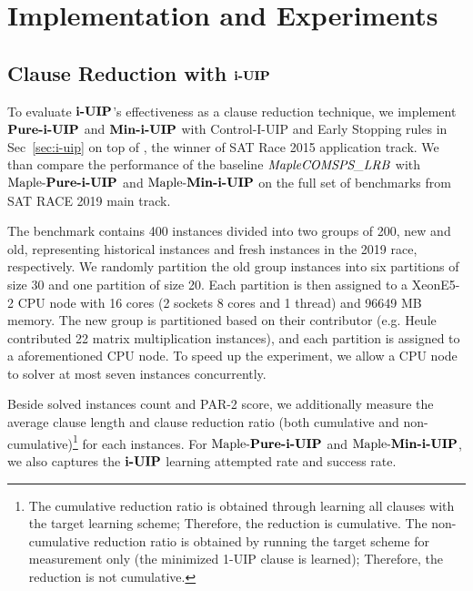 \section{Implementation and Experiments}

\subsection{Clause Reduction with $\textbf{i-UIP}$}
To evaluate $\textbf{i-UIP}$'s effectiveness as a clause reduction technique, we implement  $\textbf{Pure-i-UIP}$ and $\textbf{Min-i-UIP}$ with Control-I-UIP and Early Stopping rules in Sec~\ref{sec:i-uip} on top of \text{\MapleBase} \cite{}, the winner of SAT Race 2015 application track.  We than compare the performance of the baseline $\textit{MapleCOMSPS\_LRB}$ with $\text{Maple-\textbf{Pure-i-UIP}}$ and $\text{Maple-\textbf{Min-i-UIP}}$ on the full set of benchmarks from SAT RACE 2019 main track.

The benchmark contains 400 instances divided into two groups of 200, new and old, representing historical instances and fresh instances in the 2019 race, respectively. We randomly partition the old group instances into six partitions of size 30 and one partition of size 20. Each partition is then assigned to a XeonE5-2 CPU node with 16 cores (2 sockets 8 cores  and  1 thread) and 96649 MB memory. The new group is partitioned based on their contributor (e.g. Heule contributed 22 matrix multiplication instances), and each partition is assigned to a aforementioned CPU node. To speed up the experiment, we allow a CPU node to solver at most seven instances concurrently. 

Beside solved instances count and PAR-2 score, we additionally measure the average clause length and clause reduction ratio (both cumulative and non-cumulative)\footnote{The cumulative reduction ratio is obtained through learning all clauses with the target learning scheme; Therefore, the reduction is cumulative. The non-cumulative reduction ratio is obtained by running the target scheme for measurement only (the minimized 1-UIP clause is learned); Therefore, the reduction is not cumulative. }  for each instances. For $\text{Maple-\textbf{Pure-i-UIP}}$  and $\text{Maple-\textbf{Min-i-UIP}}$, we also captures the $\textbf{i-UIP}$ learning attempted rate and success rate.

